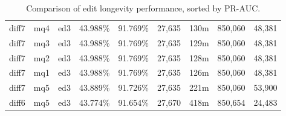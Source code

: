 \begin{sidewaystable}[!ph]
\begin{center}
\begin{tabular}{|c|c|c||c|c||c|c|c|c|}
diff7 & mq4 & ed3 & 43.988\% & 91.769\% & 27,635 & 130m & 850,060 & 48,381 \\
diff7 & mq3 & ed3 & 43.988\% & 91.769\% & 27,635 & 129m & 850,060 & 48,381 \\
diff7 & mq2 & ed3 & 43.988\% & 91.769\% & 27,635 & 128m & 850,060 & 48,381 \\
diff7 & mq1 & ed3 & 43.988\% & 91.769\% & 27,635 & 126m & 850,060 & 48,381 \\
diff7 & mq5 & ed3 & 43.889\% & 91.726\% & 27,635 & 221m & 850,060 & 53,900 \\
diff6 & mq5 & ed3 & 43.774\% & 91.654\% & 27,670 & 418m & 850,654 & 24,483 \\
\hline
\end{tabular}
\end{center}
\caption{Comparison of edit longevity performance,
    sorted by PR-AUC.}
\label{tab:editshoutD}
\end{sidewaystable}
\clearpage
